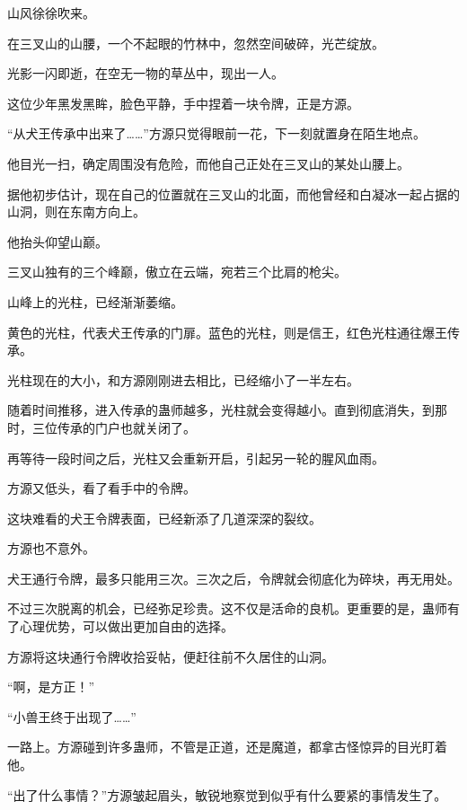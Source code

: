 
\begin{this_body}



山风徐徐吹来。

在三叉山的山腰，一个不起眼的竹林中，忽然空间破碎，光芒绽放。

光影一闪即逝，在空无一物的草丛中，现出一人。

这位少年黑发黑眸，脸色平静，手中捏着一块令牌，正是方源。

“从犬王传承中出来了……”方源只觉得眼前一花，下一刻就置身在陌生地点。

他目光一扫，确定周围没有危险，而他自己正处在三叉山的某处山腰上。

据他初步估计，现在自己的位置就在三叉山的北面，而他曾经和白凝冰一起占据的山洞，则在东南方向上。

他抬头仰望山巅。

三叉山独有的三个峰巅，傲立在云端，宛若三个比肩的枪尖。

山峰上的光柱，已经渐渐萎缩。

黄色的光柱，代表犬王传承的门扉。蓝色的光柱，则是信王，红色光柱通往爆王传承。

光柱现在的大小，和方源刚刚进去相比，已经缩小了一半左右。

随着时间推移，进入传承的蛊师越多，光柱就会变得越小。直到彻底消失，到那时，三位传承的门户也就关闭了。

再等待一段时间之后，光柱又会重新开启，引起另一轮的腥风血雨。

方源又低头，看了看手中的令牌。

这块难看的犬王令牌表面，已经新添了几道深深的裂纹。

方源也不意外。

犬王通行令牌，最多只能用三次。三次之后，令牌就会彻底化为碎块，再无用处。

不过三次脱离的机会，已经弥足珍贵。这不仅是活命的良机。更重要的是，蛊师有了心理优势，可以做出更加自由的选择。

方源将这块通行令牌收拾妥帖，便赶往前不久居住的山洞。

“啊，是方正！”

“小兽王终于出现了……”

一路上。方源碰到许多蛊师，不管是正道，还是魔道，都拿古怪惊异的目光盯着他。

“出了什么事情？”方源皱起眉头，敏锐地察觉到似乎有什么要紧的事情发生了。


\end{this_body}

